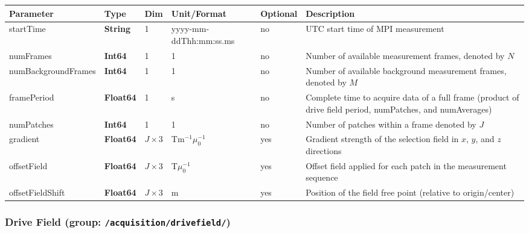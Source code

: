\documentclass[landscape,a4paper]{article} %
\newcommand{\inl}[1]{\lstinline[columns=fixed]{#1}}
\newcommand{\inltab}[1]{{\ttfamily\bfseries\color{blue}#1}}
\newcommand{\inlvar}[1]{{\ttfamily#1}}
\begin{document}
\noindent \begin{tabularx}{\columnwidth}{lllllX} 
\textbf{Parameter} & \textbf{Type} & \textbf{Dim} & \textbf{Unit/Format} & \textbf{Optional} & \textbf{Description} \\ \hline 
\inlvar{startTime} & \inltab{String} & 1 & yyyy-mm-ddThh:mm:ss.ms & no & UTC start time of MPI measurement \\ \hline
\inlvar{numFrames} & \inltab{Int64} & 1 & 1 & no & Number of available measurement frames, denoted by $N$ \\ \hline
\inlvar{numBackgroundFrames} & \inltab{Int64} & 1 & 1 & no & Number of available background measurement frames, denoted by $M$ \\ \hline
\inlvar{framePeriod} & \inltab{Float64} & 1 & s & no & Complete time to acquire data of a full frame (product of drive field \inlvar{period}, \inlvar{numPatches}, and \inlvar{numAverages}) \\ \hline
\inlvar{numPatches} & \inltab{Int64} & 1 & 1 & no & Number of patches within a frame denoted by $J$ \\ \hline 
\inlvar{gradient} & \inltab{Float64} & $J \times 3$ & Tm$^{-1}\mu_0^{-1}$ & yes & Gradient strength of the selection field in $x$, $y$, and $z$ directions \\ \hline
\inlvar{offsetField} & \inltab{Float64} & $J \times 3$ & T$\mu_0^{-1}$ & yes & Offset field applied for each patch in the measurement sequence \\ \hline
\inlvar{offsetFieldShift} & \inltab{Float64} & $J \times 3$ & m & yes & Position of the field free point (relative to origin/center) \\ \hline
\end{tabularx}


\subsubsection{Drive Field (group: \inl{/acquisition/drivefield/})}
\end{document}
